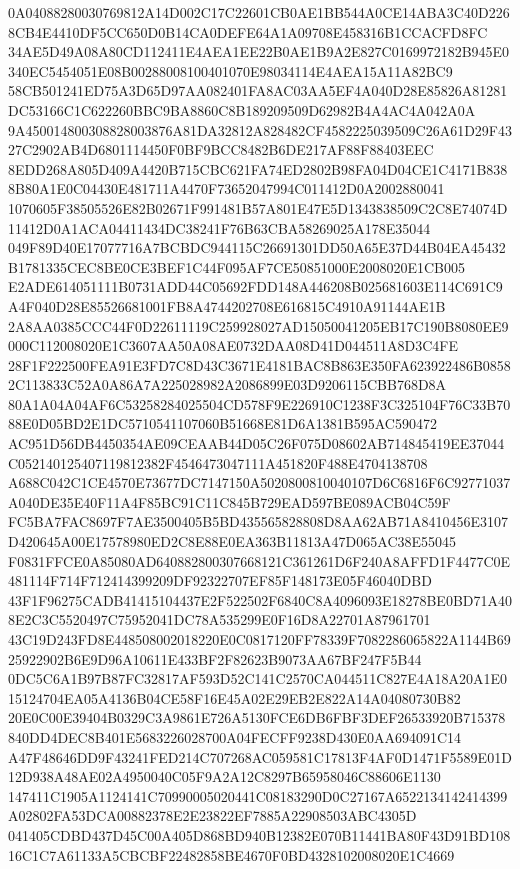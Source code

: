 \documentclass[UTF8,fontset=fandol,zihao=-4,a4paper]{ctexart}
\begin{document}
{{0A04088280030769812A14D002C17C22601CB0AE1BB544A0CE14ABA3C40D2268CB4E4410DF5CC650D0B14CA0DEFE64A1A09708E458316B1CCACFD8FC
34AE5D49A08A80CD112411E4AEA1EE22B0AE1B9A2E827C0169972182B945E0340EC5454051E08B00288008100401070E98034114E4AEA15A11A82BC9
58CB501241ED75A3D65D97AA082401FA8AC03AA5EF4A040D28E85826A81281DC53166C1C622260BBC9BA8860C8B189209509D62982B4A4AC4A042A0A
9A450014800308828003876A81DA32812A828482CF4582225039509C26A61D29F4327C2902AB4D6801114450F0BF9BCC8482B6DE217AF88F88403EEC
8EDD268A805D409A4420B715CBC621FA74ED2802B98FA04D04CE1C4171B8388B80A1E0C04430E481711A4470F73652047994C011412D0A2002880041
1070605F38505526E82B02671F991481B57A801E47E5D1343838509C2C8E74074D11412D0A1ACA04411434DC38241F76B63CBA58269025A178E35044
049F89D40E17077716A7BCBDC944115C26691301DD50A65E37D44B04EA45432B1781335CEC8BE0CE3BEF1C44F095AF7CE50851000E2008020E1CB005
E2ADE614051111B0731ADD44C05692FDD148A446208B025681603E114C691C9A4F040D28E85526681001FB8A4744202708E616815C4910A91144AE1B
2A8AA0385CCC44F0D22611119C259928027AD15050041205EB17C190B8080EE9000C112008020E1C3607AA50A08AE0732DAA08D41D044511A8D3C4FE
28F1F222500FEA91E3FD7C8D43C3671E4181BAC8B863E350FA623922486B08582C113833C52A0A86A7A225028982A2086899E03D9206115CBB768D8A
80A1A04A04AF6C53258284025504CD578F9E226910C1238F3C325104F76C33B7088E0D05BD2E1DC5710541107060B51668E81D6A1381B595AC590472
AC951D56DB4450354AE09CEAAB44D05C26F075D08602AB714845419EE37044C052140125407119812382F4546473047111A451820F488E4704138708
A688C042C1CE4570E73677DC7147150A5020800810040107D6C6816F6C92771037A040DE35E40F11A4F85BC91C11C845B729EAD597BE089ACB04C59F
FC5BA7FAC8697F7AE3500405B5BD435565828808D8AA62AB71A8410456E3107D420645A00E17578980ED2C8E88E0EA363B11813A47D065AC38E55045
F0831FFCE0A85080AD640882800307668121C361261D6F240A8AFFD1F4477C0E481114F714F712414399209DF92322707EF85F148173E05F46040DBD
43F1F96275CADB41415104437E2F522502F6840C8A4096093E18278BE0BD71A408E2C3C5520497C75952041DC78A535299E0F16D8A22701A87961701
43C19D243FD8E448508002018220E0C0817120FF78339F7082286065822A1144B6925922902B6E9D96A10611E433BF2F82623B9073AA67BF247F5B44
0DC5C6A1B97B87FC32817AF593D52C141C2570CA044511C827E4A18A20A1E015124704EA05A4136B04CE58F16E45A02E29EB2E822A14A04080730B82
20E0C00E39404B0329C3A9861E726A5130FCE6DB6FBF3DEF26533920B715378840DD4DEC8B401E5683226028700A04FECFF9238D430E0AA694091C14
A47F48646DD9F43241FED214C707268AC059581C17813F4AF0D1471F5589E01D12D938A48AE02A4950040C05F9A2A12C8297B65958046C88606E1130
147411C1905A1124141C70990005020441C08183290D0C27167A6522134142414399A02802FA53DCA00882378E2E23822EF7885A22908503ABC4305D
041405CDBD437D45C00A405D868BD940B12382E070B11441BA80F43D91BD10816C1C7A61133A5CBCBF22482858BE4670F0BD4328102008020E1C4669
}}
\end{document}
